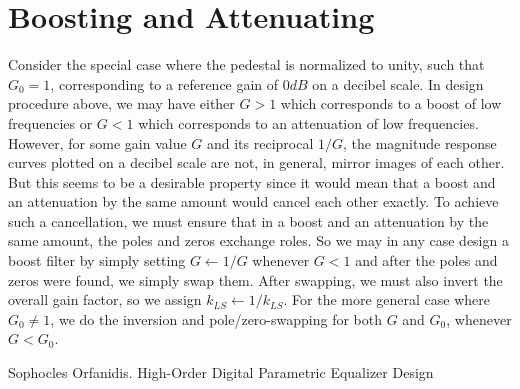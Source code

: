 \section{Boosting and Attenuating}
Consider the special case where the pedestal is normalized to unity, such that $G_0 = 1$, corresponding to a reference gain of $0 dB$ on a decibel scale. In design procedure above, we may have either $G > 1$ which corresponds to a boost of low frequencies or $G < 1$ which corresponds to an attenuation of low frequencies. However, for some gain value $G$ and its reciprocal $1/G$, the magnitude response curves plotted on a decibel scale are not, in general, mirror images of each other. But this seems to be a desirable property since it would mean that a boost and an attenuation by the same amount would cancel each other exactly. To achieve such a cancellation, we must ensure that in a boost and an attenuation by the same amount, the poles and zeros exchange roles. So we may in any case design a boost filter by simply setting $G \leftarrow 1/G$ whenever $G < 1$ and after the poles and zeros were found, we simply swap them. After swapping, we must also invert the overall gain factor, so we assign $k_{LS} \leftarrow 1/k_{LS}$. For the more general case where $G_0 \neq 1$, we do the inversion and pole/zero-swapping for both $G$ and $G_0$, whenever $G < G_0$.



\begin{thebibliography}{9}  %
  Sophocles Orfanidis. High-Order Digital Parametric Equalizer Design
\end{thebibliography}

